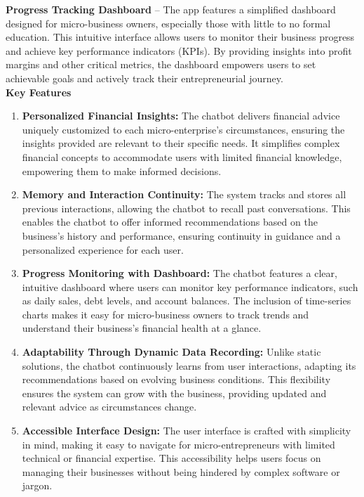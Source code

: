 \documentclass{article}
\begin{document}
\textbf{Progress Tracking Dashboard} – The app features a simplified dashboard designed for micro-business owners, especially those with little to no formal education. This intuitive interface allows users to monitor their business progress and achieve key performance indicators (KPIs). By providing insights into profit margins and other critical metrics, the dashboard empowers users to set achievable goals and actively track their entrepreneurial journey.\\


\textbf{Key Features}
    \begin{enumerate}[label=(\alph*)]
    
       \item \textbf{Personalized Financial Insights:} 
        The chatbot delivers financial advice uniquely customized to each micro-enterprise’s circumstances, ensuring the insights provided are relevant to their specific needs. It simplifies complex financial concepts to accommodate users with limited financial knowledge, empowering them to make informed decisions. 

       
       \item \textbf{Memory and Interaction Continuity:} The system tracks and stores all previous interactions, allowing the chatbot to recall past conversations. This enables the chatbot to offer informed recommendations based on the business’s history and performance, ensuring continuity in guidance and a personalized experience for each user. 

    
       \item \textbf{Progress Monitoring with Dashboard:} The chatbot features a clear, intuitive dashboard where users can monitor key performance indicators, such as daily sales, debt levels, and account balances. The inclusion of time-series charts makes it easy for micro-business owners to track trends and understand their business's financial health at a glance. 
    
       \item \textbf{Adaptability Through Dynamic Data Recording: } Unlike static solutions, the chatbot continuously learns from user interactions, adapting its recommendations based on evolving business conditions. This flexibility ensures the system can grow with the business, providing updated and relevant advice as circumstances change.
       
      \item \textbf{Accessible Interface Design:} The user interface is crafted with simplicity in mind, making it easy to navigate for micro-entrepreneurs with limited technical or financial expertise. This accessibility helps users focus on managing their businesses without being hindered by complex software or jargon.
      

\end{enumerate}
\end{document}
